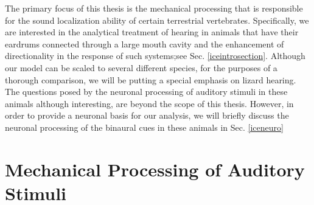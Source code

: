 The primary focus of this thesis is the mechanical processing that is responsible for the
sound localization ability of certain terrestrial vertebrates. Specifically, we are interested
in the analytical treatment of hearing in animals that have their eardrums connected through a large mouth cavity and the
 enhancement of directionality in the response of such systems;see Sec. \ref{iceintrosection}. Although our model can be scaled to several different species,
 for the purposes of a thorough comparison, we will be putting a special emphasis on lizard hearing. The questions posed by the neuronal processing of auditory stimuli in these
animals although interesting, are beyond the scope of this thesis. However, in order to provide a neuronal basis for our analysis, we will briefly discuss the neuronal processing of the binaural cues
in these animals in Sec. \ref{iceneuro}

\section{Mechanical Processing of Auditory Stimuli}\label{mechanicalprocessing}
